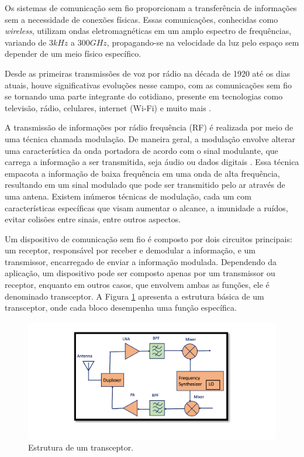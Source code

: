Os sistemas de comunicação sem fio proporcionam a transferência de informações sem a necessidade de conexões físicas. Essas comunicações, conhecidas como \textit{wireless}, utilizam ondas eletromagnéticas em um amplo espectro de frequências, variando de $3kHz$ a $300GHz$, propagando-se na velocidade da luz pelo espaço sem depender de um meio físico específico.

Desde as primeiras transmissões de voz por rádio na década de 1920 até os dias atuais, houve significativas evoluções nesse campo, com as comunicações sem fio se tornando uma parte integrante do cotidiano, presente em tecnologias como televisão, rádio, celulares, internet (Wi-Fi) e muito mais \cite{dowla2003handbook}.

A transmissão de informações por rádio frequência (RF) é realizada por meio de uma técnica chamada modulação. De maneira geral, a modulação envolve alterar uma característica da onda portadora de acordo com o sinal modulante, que carrega a informação a ser transmitida, seja áudio ou dados digitais \cite{engtadeu2011}. Essa técnica empacota a informação de baixa frequência em uma onda de alta frequência, resultando em um sinal modulado que pode ser transmitido pelo ar através de uma antena. Existem inúmeros técnicas de modulação, cada um com características específicas que visam aumentar o alcance, a imunidade a ruídos, evitar colisões entre sinais, entre outros aspectos.

Um dispositivo de comunicação sem fio é composto por dois circuitos principais: um receptor, responsável por receber e demodular a informação, e um transmissor, encarregado de enviar a informação modulada. Dependendo da aplicação, um dispositivo pode ser composto apenas por um transmissor ou receptor, enquanto em outros casos, que envolvem ambas as funções, ele é denominado transceptor. A Figura \ref{fig:tranceiver_structure} apresenta a estrutura básica de um transceptor, onde cada bloco desempenha uma função específica.
\begin{figure}[h!]
	\caption{Estrutura de um transceptor.}
	\begin{center}
		\includegraphics[scale=0.6]{img/tranceiver_structure.png}
	\end{center}
	\label{fig:tranceiver_structure}
\end{figure}


